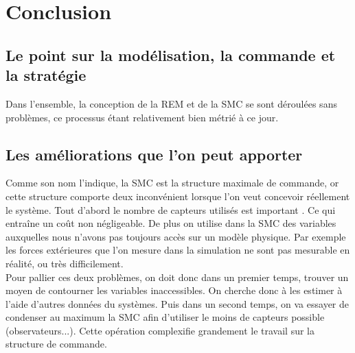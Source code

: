 \section{Conclusion}

\subsection{Le point sur la modélisation, la commande et la stratégie}

Dans l'ensemble, la conception de la REM et de la SMC se sont déroulées sans problèmes, ce processus étant relativement bien métrié à ce jour. %


\subsection{Les améliorations que l'on peut apporter}

Comme son nom l'indique, la SMC est la structure maximale de commande, or cette structure comporte deux inconvénient lorsque l'on veut concevoir réellement le système. Tout d'abord le nombre de capteurs utilisés est important . Ce qui entraîne un coût non négligeable. De plus on utilise dans la SMC des variables auxquelles nous n'avons pas toujours accès sur un modèle physique. Par exemple les forces extérieures que l'on mesure dans la simulation ne sont pas mesurable en réalité, ou très difficilement. \\

Pour pallier ces deux problèmes, on doit donc dans un premier temps, trouver un moyen de contourner les variables inaccessibles. On cherche donc à les estimer à l'aide d'autres données du systèmes. Puis dans un second temps, on va essayer de condenser au maximum la SMC afin d'utiliser le moins de capteurs possible (observateurs...). Cette opération complexifie grandement le travail sur la structure de commande. 
